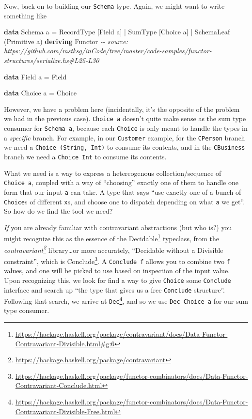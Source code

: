 \documentclass[]{article}
\newenvironment{Shaded}{}{}
\newcommand{\CommentTok}[1]{\textcolor[rgb]{0.38,0.63,0.69}{\textit{#1}}}
\newcommand{\DataTypeTok}[1]{\textcolor[rgb]{0.56,0.13,0.00}{#1}}
\newcommand{\KeywordTok}[1]{\textcolor[rgb]{0.00,0.44,0.13}{\textbf{#1}}}
\newcommand{\NormalTok}[1]{#1}
\newcommand{\OperatorTok}[1]{\textcolor[rgb]{0.40,0.40,0.40}{#1}}
\newcommand{\OtherTok}[1]{\textcolor[rgb]{0.00,0.44,0.13}{#1}}
\renewcommand{\href}[2]{#2\footnote{\url{#1}}}
\begin{document}
Now, back on to building our \texttt{Schema} type. Again, we might want to write
something like

\begin{Shaded}
\begin{Highlighting}[]
\KeywordTok{data} \DataTypeTok{Schema}\NormalTok{ a }\OtherTok{=}
      \DataTypeTok{RecordType}\NormalTok{  [}\DataTypeTok{Field}\NormalTok{ a]}
    \OperatorTok{|} \DataTypeTok{SumType}\NormalTok{     [}\DataTypeTok{Choice}\NormalTok{ a]}
    \OperatorTok{|} \DataTypeTok{SchemaLeaf}\NormalTok{  (}\DataTypeTok{Primitive}\NormalTok{ a)}
  \KeywordTok{deriving} \DataTypeTok{Functor}
\CommentTok{{-}{-} source: https://github.com/mstksg/inCode/tree/master/code{-}samples/functor{-}structures/serialize.hs\#L25{-}L30}

\KeywordTok{data} \DataTypeTok{Field}\NormalTok{ a }\OtherTok{=} \DataTypeTok{Field}

\KeywordTok{data} \DataTypeTok{Choice}\NormalTok{ a }\OtherTok{=} \DataTypeTok{Choice}
\end{Highlighting}
\end{Shaded}

However, we have a problem here (incidentally, it's the opposite of the problem
we had in the previous case). \texttt{Choice\ a} doesn't quite make sense as the
sum type consumer for \texttt{Schema\ a}, because each \texttt{Choice} is only
meant to handle the types in a \emph{specific} branch. For example, in our
\texttt{Customer} example, for the \texttt{CPerson} branch we need a
\texttt{Choice\ (String,\ Int)} to consume its contents, and in the
\texttt{CBusiness} branch we need a \texttt{Choice\ Int} to consume its
contents.

What we need is a way to express a hetereogenous collection/sequence of
\texttt{Choice\ a}, coupled with a way of ``choosing'' exactly one of them to
handle one form that our input \texttt{a} can take. A type that says ``use
exactly one of a bunch of \texttt{Choice}s of different \texttt{x}s, and choose
one to dispatch depending on what \texttt{a} we get''. So how do we find the
tool we need?

\emph{If} you are already familiar with contravariant abstractions (but who is?)
you might recognize this as the essence of the
\href{https://hackage.haskell.org/package/contravariant/docs/Data-Functor-Contravariant-Divisible.html\#g:6}{Decidable}
typeclass, from the
\emph{\href{https://hackage.haskell.org/package/contravariant}{contravariant}}
library\ldots or more accurately, ``Decidable without a Divisible constraint'',
which is
\href{https://hackage.haskell.org/package/functor-combinators/docs/Data-Functor-Contravariant-Conclude.html}{Conclude}.
A \texttt{Conclude\ f} allows you to combine two \texttt{f} values, and one will
be picked to use based on inspection of the input value. Upon recognizing this,
we look for find a way to give \texttt{Choice} some \texttt{Conclude} interface
and search up ``the type that gives us a free \texttt{Conclude} structure''.
Following that search, we arrive at
\href{https://hackage.haskell.org/package/functor-combinators/docs/Data-Functor-Contravariant-Divisible-Free.html}{\texttt{Dec}},
and so we use \texttt{Dec\ Choice\ a} for our sum type consumer.
\end{document}
